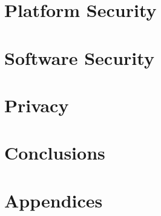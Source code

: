\documentclass[
letterpaper, %
oneside,
nobib
]{tufte-book}
\begin{document}
\part{Platform Security} 






\part{Software Security}

 



\part{Privacy}



\part{Conclusions}



\appendix
\part{Appendices}


\backmatter

\printbibliography
\end{document}
